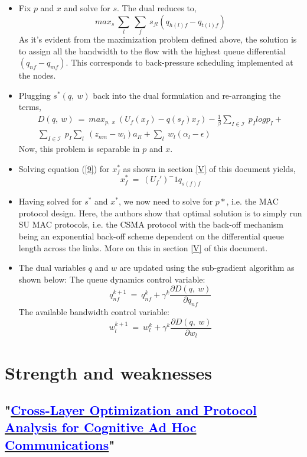 \documentclass[12pt, draftcls, onecolumn]{IEEEtran}
\begin{document}
\begin{itemize}
    \item Fix $p$ and $x$ and solve for $s$. The dual reduces to,
    \[max_s\ \sum_{l}\ \sum_{f}\ s_{fl}(q_{h(l)f} - q_{t(l)f})\]
    As it's evident from the maximization problem defined above, the solution is to assign all the bandwidth to the flow with the highest queue differential $(q_{nf} - q_{mf})$. This corresponds to back-pressure scheduling implemented at the nodes.
    \item Plugging $s^*(q,\ w)$ back into the dual formulation and re-arranging the terms,
    \begin{equation}\label{9}
        \begin{aligned}
            D(q,\ w)\ =\ max_{p,\ x}\ (U_f(x_f) - q(s_f)x_f) - \frac{1}{\beta}\sum_{I \in \mathcal{I}}\ p_I log p_I + \\\sum_{I \in \mathcal{I}}\ p_I\sum_{l}\ (z_{nm} - w_l)a_{Il} + \sum_{l}\ w_l(\alpha_l - \epsilon)
        \end{aligned}
    \end{equation}
    Now, this problem is separable in $p$ and $x$.
    \item Solving equation (\ref{9}) for $x_f^*$ as shown in section \ref{V} of this document yields,
    \[x_f^*\ =\ (U_f')^-1 q_{s(f)f}\]
    \item Having solved for $s^*$ and $x^*$, we now need to solve for $p*$, i.e. the MAC protocol design. Here, the authors show that optimal solution is to simply run SU MAC protocols, i.e. the CSMA protocol with the back-off mechanism being an exponential back-off scheme dependent on the differential queue length across the links. More on this in section \ref{V} of this document.
    \item The dual variables $q$ and $w$ are updated using the sub-gradient algorithm as shown below:
    The queue dynamics control variable:
    \[q_{nf}^{k+1}\ =\ q_{nf}^{k} + \gamma^{k}\frac{\partial D(q,\ w)}{\partial q_{nf}}\]
    The available bandwidth control variable:
    \[w_{l}^{k+1}\ =\ w_{l}^{k} + \gamma^{k}\frac{\partial D(q,\ w)}{\partial w_l}\]
\end{itemize}
\section{Strength and weaknesses}
\subsection{"\href{http://ieeexplore.ieee.org/stamp/stamp.jsp?tp=&arnumber=7859326&isnumber=7859429}{\textcolor{blue}{Cross-Layer Optimization and Protocol Analysis for Cognitive Ad Hoc Communications}}"}
\end{document}

